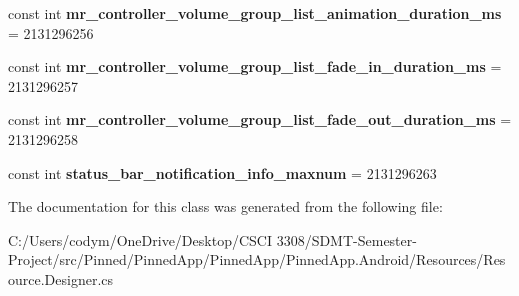 \begin{DoxyCompactItemize}
\item 
\mbox{\label{class_pinned_app_1_1_droid_1_1_resource_1_1_integer_a791fc3e8abd12f354a2e0e1ded5ff819}} 
const int {\bfseries mr\+\_\+controller\+\_\+volume\+\_\+group\+\_\+list\+\_\+animation\+\_\+duration\+\_\+ms} = 2131296256
\item 
\mbox{\label{class_pinned_app_1_1_droid_1_1_resource_1_1_integer_a34d8e9e681312d1d391fba77167c72b9}} 
const int {\bfseries mr\+\_\+controller\+\_\+volume\+\_\+group\+\_\+list\+\_\+fade\+\_\+in\+\_\+duration\+\_\+ms} = 2131296257
\item 
\mbox{\label{class_pinned_app_1_1_droid_1_1_resource_1_1_integer_a0ea8af06e22d62e4cbb20d868d4109a4}} 
const int {\bfseries mr\+\_\+controller\+\_\+volume\+\_\+group\+\_\+list\+\_\+fade\+\_\+out\+\_\+duration\+\_\+ms} = 2131296258
\item 
\mbox{\label{class_pinned_app_1_1_droid_1_1_resource_1_1_integer_a284680d89c2e7890d960de5f563fefc7}} 
const int {\bfseries status\+\_\+bar\+\_\+notification\+\_\+info\+\_\+maxnum} = 2131296263
\end{DoxyCompactItemize}


The documentation for this class was generated from the following file\+:\begin{DoxyCompactItemize}
\item 
C\+:/\+Users/codym/\+One\+Drive/\+Desktop/\+C\+S\+C\+I 3308/\+S\+D\+M\+T-\/\+Semester-\/\+Project/src/\+Pinned/\+Pinned\+App/\+Pinned\+App/\+Pinned\+App.\+Android/\+Resources/Resource.\+Designer.\+cs\end{DoxyCompactItemize}
